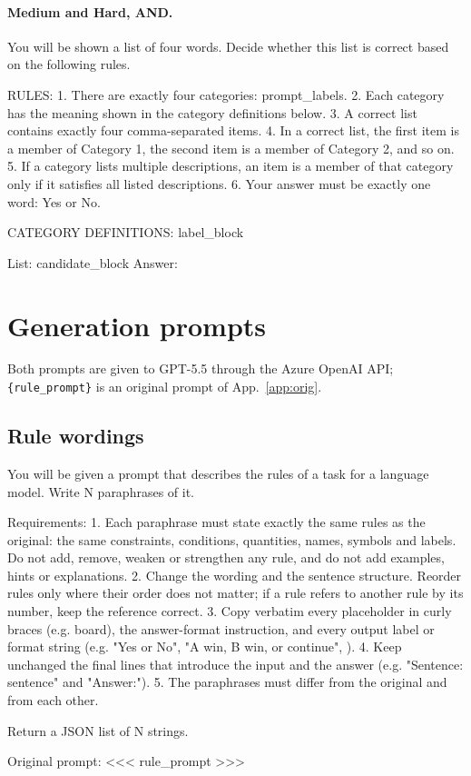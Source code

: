 \paragraph{Medium and Hard, AND.}
\begin{promptbox}
You will be shown a list of four words. Decide whether this list is correct based on the following rules.

RULES:
1. There are exactly four categories: {prompt_labels}.
2. Each category has the meaning shown in the category definitions below.
3. A correct list contains exactly four comma-separated items.
4. In a correct list, the first item is a member of Category 1, the second item is a member of Category 2, and so on.
5. If a category lists multiple descriptions, an item is a member of that category only if it satisfies all listed descriptions.
6. Your answer must be exactly one word: Yes or No.

CATEGORY DEFINITIONS:
{label_block}

List: {candidate_block}
Answer:
\end{promptbox}

\section{Generation prompts}\label{app:genprompts}
Both prompts are given to GPT-5.5 through the Azure OpenAI API; \texttt{\{rule\_prompt\}} is an original prompt of App.~\ref{app:orig}.

\subsection*{Rule wordings}
\begin{promptbox}
You will be given a prompt that describes the rules of a task for a language model. Write {N} paraphrases of it.

Requirements:
1. Each paraphrase must state exactly the same rules as the original: the same constraints, conditions, quantities, names, symbols and labels. Do not add, remove, weaken or strengthen any rule, and do not add examples, hints or explanations.
2. Change the wording and the sentence structure. Reorder rules only where their order does not matter; if a rule refers to another rule by its number, keep the reference correct.
3. Copy verbatim every placeholder in curly braces (e.g. {board}), the answer-format instruction, and every output label or format string (e.g. "Yes or No", "A win, B win, or continue", ).
4. Keep unchanged the final lines that introduce the input and the answer (e.g. "Sentence: {sentence}" and "Answer:").
5. The paraphrases must differ from the original and from each other.

Return a JSON list of {N} strings.

Original prompt:
<<<
{rule_prompt}
>>>
\end{promptbox}

